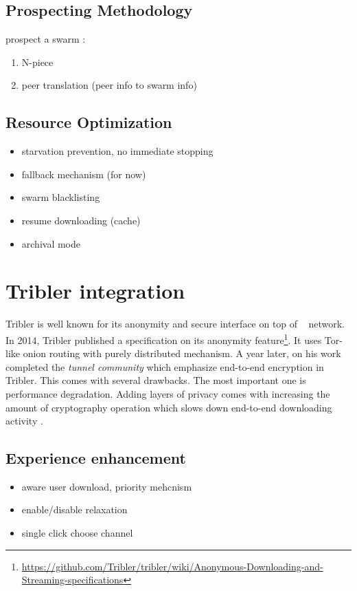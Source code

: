 \subsection{Prospecting Methodology}
prospect a swarm : 
\begin{enumerate}
	\item N-piece
	\item peer translation (peer info to swarm info)
\end{enumerate}

\subsection{Resource Optimization}
\begin{itemize}
	\item starvation prevention, no immediate stopping
	 \item fallback mechanism (for now)
\item 	 swarm blacklisting
\item 	 resume downloading (cache)
\item 	 archival mode
\end{itemize}


\section{Tribler integration}
Tribler is well known for its anonymity and secure interface on top of \bt~ network. In 2014, Tribler published a specification on its anonymity feature\footnote{\url{https://github.com/Tribler/tribler/wiki/Anonymous-Downloading-and-Streaming-specifications}}. It uses Tor-like onion routing with purely distributed mechanism. A year later, \citeauthor{2015:tunnel:ruigrok} on his work completed the \textit{tunnel community} which emphasize end-to-end encryption in Tribler. This comes with several drawbacks. The most important one is performance degradation. Adding layers of privacy comes with increasing the amount of cryptography operation which slows down end-to-end downloading activity \cite{2015:tunnel:ruigrok}.

\subsection{Experience enhancement}
\begin{itemize}
\item  aware user download, priority mehcnism
\item  enable/disable relaxation
\item single click choose channel
\end{itemize}


